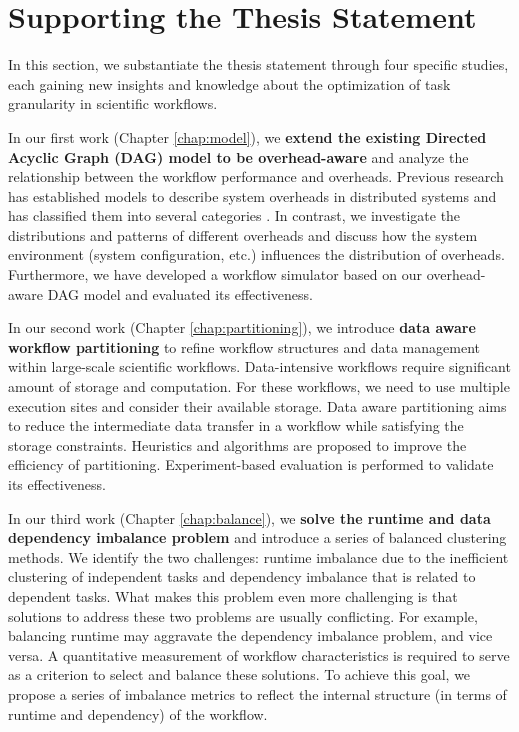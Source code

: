 \section{Supporting the Thesis Statement}

In this section, we substantiate the thesis statement through four specific studies, each gaining new insights and knowledge about the optimization of task granularity in scientific workflows. 

In our first work \cite{Chen2011} (Chapter \ref{chap:model}), we \textbf{extend the existing Directed Acyclic Graph (DAG) model to be overhead-aware} and analyze the relationship between the workflow performance and overheads. Previous research has established models to describe system overheads in distributed systems and has classified them into several categories \cite{Prodan2007, Prodan2008}. In contrast, we investigate the distributions and patterns of different overheads and discuss how the system environment (system configuration, etc.) influences the distribution of overheads. Furthermore, we have developed a workflow simulator based on our overhead-aware DAG model and evaluated its effectiveness. 

In our second work \cite{Integration2012, Chen2011a} (Chapter \ref{chap:partitioning}), we introduce \textbf{data aware workflow partitioning} to refine workflow structures and data management within large-scale scientific workflows. Data-intensive workflows require significant amount of storage and computation. For these workflows, we need to use multiple execution sites and consider their available storage. Data aware partitioning aims to reduce the intermediate data transfer in a workflow while satisfying the storage constraints. Heuristics and algorithms are proposed to improve the efficiency of partitioning. Experiment-based evaluation is performed to validate its effectiveness.  

In our third work \cite{Chen2013a,Chen2013b} (Chapter \ref{chap:balance}), we \textbf{solve the runtime and data dependency imbalance problem} and introduce a series of balanced clustering methods. 
We identify the two challenges: runtime imbalance due to the inefficient clustering of independent tasks and dependency imbalance that is related to dependent tasks. What makes this problem even more challenging is that solutions to address these two problems are usually conflicting. For example, balancing runtime may aggravate the dependency imbalance problem, and vice versa. A quantitative measurement of workflow characteristics is required to serve as a criterion to select and balance these solutions. To achieve this goal, we propose a series of imbalance metrics to reflect the internal structure (in terms of runtime and dependency) of the workflow. 


